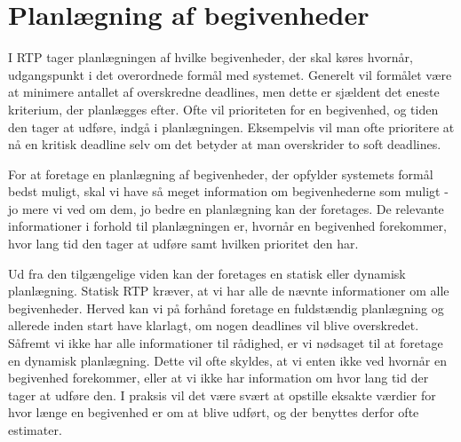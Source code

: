 \section{Planlægning af begivenheder}
I RTP tager planlægningen af hvilke begivenheder, der skal køres hvornår, udgangspunkt i det overordnede formål med systemet. Generelt vil formålet være at minimere antallet af overskredne deadlines, men dette er sjældent det eneste kriterium, der planlægges efter. Ofte vil prioriteten for en begivenhed, og tiden den tager at udføre, indgå i planlægningen. Eksempelvis vil man ofte prioritere at nå en kritisk deadline selv om det betyder at man overskrider to soft deadlines. 


For at foretage en planlægning af begivenheder, der opfylder systemets formål bedst muligt, skal vi have så meget information om begivenhederne som muligt - jo mere vi ved om dem, jo bedre en planlægning kan der foretages. De relevante informationer i forhold til planlægningen er, hvornår en begivenhed forekommer, hvor lang tid den tager at udføre samt hvilken prioritet den har. 

Ud fra den tilgængelige viden kan der foretages en statisk eller dynamisk planlægning\cite{cheng1987scheduling}. Statisk RTP kræver, at vi har alle de nævnte informationer om alle begivenheder. Herved kan vi på forhånd foretage en fuldstændig planlægning og allerede inden start have klarlagt, om nogen deadlines vil blive overskredet. Såfremt vi ikke har alle informationer til rådighed, er vi nødsaget til at foretage en dynamisk planlægning. Dette vil ofte skyldes, at vi enten ikke ved hvornår en begivenhed forekommer, eller at vi ikke har information om hvor lang tid der tager at udføre den. I praksis vil det være svært at opstille eksakte værdier for hvor længe en begivenhed er om at blive udført, og der benyttes derfor ofte estimater. 


